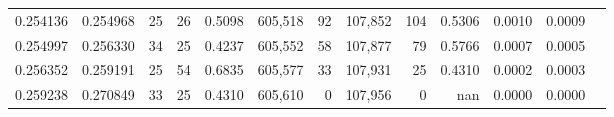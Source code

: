 \begin{tabular}{rrrrrrrrrrrrr}
0.254136 & 0.254968 &  25 &  26 &                                     0.5098 & 605,518 &      92 & 107,852 &     104 & 0.5306 & 0.0010 & 0.0009 \\
0.254997 & 0.256330 &  34 &  25 &                                     0.4237 & 605,552 &      58 & 107,877 &      79 & 0.5766 & 0.0007 & 0.0005 \\
0.256352 & 0.259191 &  25 &  54 &                                     0.6835 & 605,577 &      33 & 107,931 &      25 & 0.4310 & 0.0002 & 0.0003 \\
0.259238 & 0.270849 &  33 &  25 &                                     0.4310 & 605,610 &       0 & 107,956 &       0 &    nan & 0.0000 & 0.0000 \\
\bottomrule
\end{tabular}

